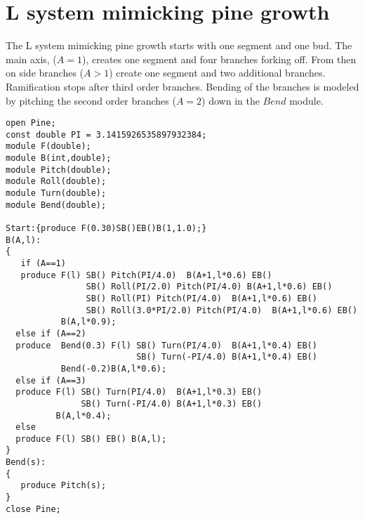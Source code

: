 \section{L system mimicking pine growth}\label{sec:L1}
The L system  mimicking pine  growth starts with  one segment  and one
bud.  The main axis, ($A  = 1$),  creates one  segment and  four branches
forking off.  From then on side  branches ($A > 1$) create one segment
and  two additional  branches.  Ramification  stops after  third order
branches. Bending  of the branches  is modeled by pitching  the second
order branches ($A = 2$) down in the $Bend$ module.

\begin{verbatim}
open Pine;
const double PI = 3.1415926535897932384;
module F(double);
module B(int,double);
module Pitch(double);
module Roll(double);
module Turn(double);
module Bend(double);

Start:{produce F(0.30)SB()EB()B(1,1.0);}
B(A,l):
{
   if (A==1)
   produce F(l) SB() Pitch(PI/4.0)  B(A+1,l*0.6) EB() 
                SB() Roll(PI/2.0) Pitch(PI/4.0) B(A+1,l*0.6) EB()
                SB() Roll(PI) Pitch(PI/4.0)  B(A+1,l*0.6) EB() 
                SB() Roll(3.0*PI/2.0) Pitch(PI/4.0)  B(A+1,l*0.6) EB()
           B(A,l*0.9);
  else if (A==2)
  produce  Bend(0.3) F(l) SB() Turn(PI/4.0)  B(A+1,l*0.4) EB() 
                          SB() Turn(-PI/4.0) B(A+1,l*0.4) EB()
           Bend(-0.2)B(A,l*0.6);
  else if (A==3)
  produce F(l) SB() Turn(PI/4.0)  B(A+1,l*0.3) EB() 
               SB() Turn(-PI/4.0) B(A+1,l*0.3) EB()
          B(A,l*0.4);
  else
  produce F(l) SB() EB() B(A,l);
}
Bend(s):
{
   produce Pitch(s);
}
close Pine;

\end{verbatim}
